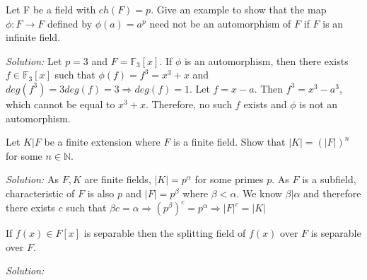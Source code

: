 \documentclass[a4paper, 11pt]{article}
\newenvironment{solution}
    {\textit{Solution:}}
    {}
\begin{document}
\begin{tcolorbox}[colback=c2,colframe=c1,title=Problem 4.4]
    Let F be a field with $ch(F) = p$. Give an example to show that the map
$\phi: F \to F$ defined by $\phi(a) = a^p$ need not be an automorphism of $F$ if $F$ is an
infinite field.
\end{tcolorbox}
\begin{solution}
    Let $p=3$ and $F=\mathbb{F}_3[x]$. If $\phi$ is an automorphism, then there exists $f\in\mathbb F_3[x]$ such that $\phi(f)=f^3=x^3+x$ and $deg(f^3)=3deg(f)=3\Rightarrow deg(f)=1$. Let $f=x-a$. Then $f^3=x^3-a^3$, which cannot be equal to $x^3+x$.  Therefore, no such $f$ exists and $\phi$ is not an automorphism.
\end{solution}



\begin{tcolorbox}[colback=c2,colframe=c1,title=Problem 4.5]
    Let $K | F$ be a finite extension where $F$ is a finite field. Show that $|K| = (|F|)^n$ for some $n \in\mathbb N$.
\end{tcolorbox}
\begin{solution}
    As $F,K$ are finite fields, $|K|=p^\alpha$ for some primes $p$. As $F$ is a subfield, characteristic of $F$ is also $p$ and $|F|=p^\beta$ where $\beta<\alpha$. We know $\beta|\alpha$ and therefore there exists $c$ such that $\beta c=\alpha\Rightarrow (p^\beta)^c=p^\alpha\Rightarrow |F|^c=|K|$
\end{solution}



\begin{tcolorbox}[colback=c2,colframe=c1,title=Problem 4.6]
    If $f(x) \in F[x]$ is separable then the splitting field of $f(x)$ over $F$ is separable
    over $F$.
\end{tcolorbox}
\begin{solution}
    
\end{solution}
\end{document}
